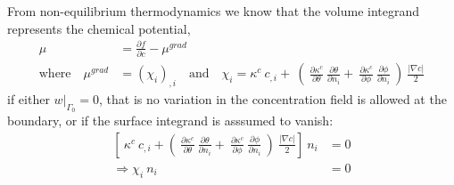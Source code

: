 From non-equilibrium thermodynamics we know that the volume integrand represents the chemical potential, 
\begin{align}
\mu &= \frac{\partial f}{\partial c} - \mu^{grad}  \label{eqMU}\\
\text{where} \quad \mu^{grad} &= (\chi_i)_{,i} \quad \text{and} \quad \chi_i = \kappa^c~c_{,i} + ~\left(~\frac{\partial \kappa^c}{\partial \theta} ~\frac{\partial \theta}{\partial n_i} +  ~\frac{\partial \kappa^c}{\partial \phi} ~\frac{\partial \phi}{\partial n_i} ~\right) ~\frac{|\nabla c|}{2} \nonumber
\end{align}
if either $w|_{\Gamma_0}=0$, that is no variation in the concentration field is allowed at the boundary, or if the surface integrand is asssumed to vanish:
\begin{align}
\left[ ~\kappa^c~c_{,i}  + \left( ~\frac{\partial \kappa^c}{\partial \theta} ~\frac{\partial \theta}{\partial n_i} +  ~\frac{\partial \kappa^c}{\partial \phi} ~\frac{\partial \phi}{\partial n_i} ~\right) ~\frac{|\nabla c|}{2}  \right] ~n_{i} &= 0 \nonumber \\
\Rightarrow \chi_i ~ n_{i} &= 0 
\label{eqSurfaceCondition}
\end{align}

